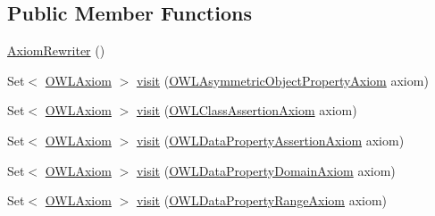 \subsection*{Public Member Functions}
\begin{DoxyCompactItemize}
\item 
\hyperlink{classorg_1_1semanticweb_1_1owlapi_1_1util_1_1_structural_transformation_1_1_axiom_rewriter_a19dd5643ecf7b678df0cfce65ce77710}{Axiom\-Rewriter} ()
\item 
Set$<$ \hyperlink{interfaceorg_1_1semanticweb_1_1owlapi_1_1model_1_1_o_w_l_axiom}{O\-W\-L\-Axiom} $>$ \hyperlink{classorg_1_1semanticweb_1_1owlapi_1_1util_1_1_structural_transformation_1_1_axiom_rewriter_ac7f143672ccd59cc205154f79c4fd3d3}{visit} (\hyperlink{interfaceorg_1_1semanticweb_1_1owlapi_1_1model_1_1_o_w_l_asymmetric_object_property_axiom}{O\-W\-L\-Asymmetric\-Object\-Property\-Axiom} axiom)
\item 
Set$<$ \hyperlink{interfaceorg_1_1semanticweb_1_1owlapi_1_1model_1_1_o_w_l_axiom}{O\-W\-L\-Axiom} $>$ \hyperlink{classorg_1_1semanticweb_1_1owlapi_1_1util_1_1_structural_transformation_1_1_axiom_rewriter_a359b6c9833e257cc5c4cc6679f8e5929}{visit} (\hyperlink{interfaceorg_1_1semanticweb_1_1owlapi_1_1model_1_1_o_w_l_class_assertion_axiom}{O\-W\-L\-Class\-Assertion\-Axiom} axiom)
\item 
Set$<$ \hyperlink{interfaceorg_1_1semanticweb_1_1owlapi_1_1model_1_1_o_w_l_axiom}{O\-W\-L\-Axiom} $>$ \hyperlink{classorg_1_1semanticweb_1_1owlapi_1_1util_1_1_structural_transformation_1_1_axiom_rewriter_a4aed3cae9ca7a7684ac074ca8f7d506d}{visit} (\hyperlink{interfaceorg_1_1semanticweb_1_1owlapi_1_1model_1_1_o_w_l_data_property_assertion_axiom}{O\-W\-L\-Data\-Property\-Assertion\-Axiom} axiom)
\item 
Set$<$ \hyperlink{interfaceorg_1_1semanticweb_1_1owlapi_1_1model_1_1_o_w_l_axiom}{O\-W\-L\-Axiom} $>$ \hyperlink{classorg_1_1semanticweb_1_1owlapi_1_1util_1_1_structural_transformation_1_1_axiom_rewriter_a0a65fa8a6f4c4c32f72c1defbfde920d}{visit} (\hyperlink{interfaceorg_1_1semanticweb_1_1owlapi_1_1model_1_1_o_w_l_data_property_domain_axiom}{O\-W\-L\-Data\-Property\-Domain\-Axiom} axiom)
\item 
Set$<$ \hyperlink{interfaceorg_1_1semanticweb_1_1owlapi_1_1model_1_1_o_w_l_axiom}{O\-W\-L\-Axiom} $>$ \hyperlink{classorg_1_1semanticweb_1_1owlapi_1_1util_1_1_structural_transformation_1_1_axiom_rewriter_a88b1dd60b998974153a6368f8199bfa9}{visit} (\hyperlink{interfaceorg_1_1semanticweb_1_1owlapi_1_1model_1_1_o_w_l_data_property_range_axiom}{O\-W\-L\-Data\-Property\-Range\-Axiom} axiom)

\end{DoxyCompactItemize}
